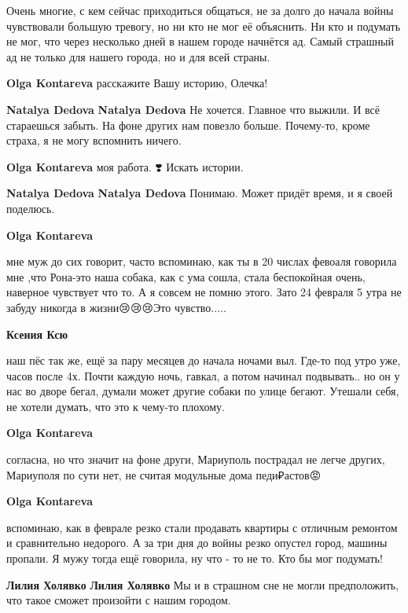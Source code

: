 
Очень многие, с кем сейчас приходиться общаться, не за долго до начала войны
чувствовали большую тревогу, но ни кто не мог её объяснить. Ни кто и подумать
не мог, что через несколько дней в нашем городе начнётся ад. Самый страшный ад
не только для нашего города, но и для всей страны.

\begin{itemize} %
\textbf{Olga Kontareva} расскажите Вашу историю, Олечка! 🙏

\textbf{Natalya Dedova} \textbf{Natalya Dedova} Не хочется. Главное что выжили. И всё стараешься забыть. На фоне других нам повезло больше. Почему-то, кроме страха, я не могу вспомнить ничего.

\textbf{Olga Kontareva} моя работа. ❣️ Искать истории.🙏

\textbf{Natalya Dedova} \textbf{Natalya Dedova} Понимаю. Может придёт время, и я своей поделюсь.

\textbf{Olga Kontareva} 

мне муж до сих говорит, часто вспоминаю, как ты в 20 числах февоаля говорила мне
,что Рона-это наша собака, как с ума сошла, стала беспокойная очень, наверное
чувствует что то. А я совсем не помню этого. Зато 24 февраля 5 утра не забуду
никогда в жизни😢😢😢Это чувство.....

\textbf{Ксения Ксю} 

наш пёс так же, ещё за пару месяцев до начала ночами выл. Где-то под утро
уже, часов после 4х. Почти каждую ночь, гавкал, а потом начинал подвывать.. но он
у нас во дворе бегал, думали может другие собаки по улице бегают. Утешали
себя, не хотели думать, что это к чему-то плохому.

\textbf{Olga Kontareva} 

согласна, но что значит на фоне други, Мариуполь пострадал не легче других,
Мариуполя по сути нет, не считая модульные дома педи₽астов😡

\textbf{Olga Kontareva} 

вспоминаю, как в феврале резко стали продавать квартиры с отличным ремонтом и
сравнительно недорого. А за три дня до войны резко опустел город, машины
пропали. Я мужу тогда ещё говорила, ну что - то не то. Кто бы мог подумать!

\textbf{Лилия Холявко} \textbf{Лилия Холявко} Мы и в страшном сне не могли предположить, что такое сможет произойти с нашим городом.

\end{itemize} %

